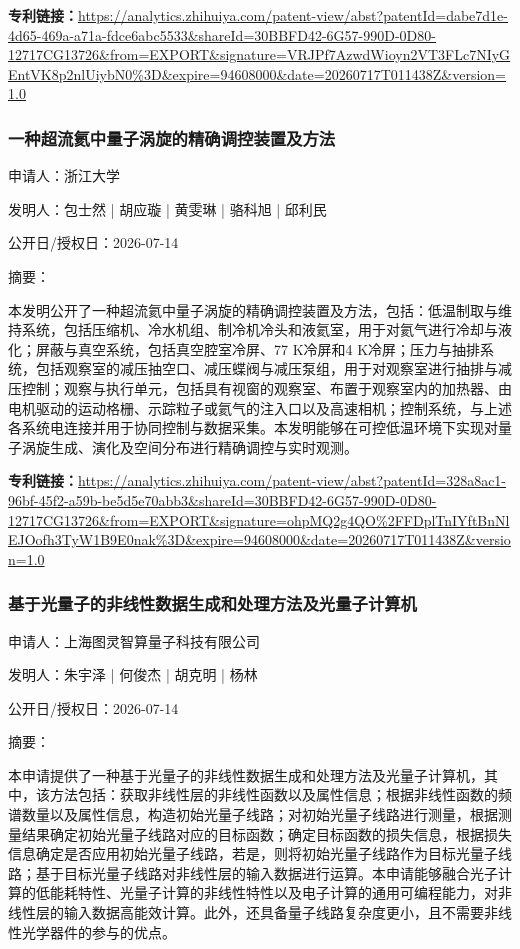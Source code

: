\documentclass[12pt,a4paper]{ctexart}
\begin{document}
\noindent\textbf{专利链接：}\url{https://analytics.zhihuiya.com/patent-view/abst?patentId=dabe7d1e-4d65-469a-a71a-fdce6abc5533&shareId=30BBFD42-6G57-990D-0D80-12717CG13726&from=EXPORT&signature=VRJPf7AzwdWioyn2VT3FLc7NIyGEntVK8p2nlUiybN0%3D&expire=94608000&date=20260717T011438Z&version=1.0}

\subsubsection{ 一种超流氦中量子涡旋的精确调控装置及方法 }

申请人：浙江大学

发明人：包士然 | 胡应璇 | 黄雯琳 | 骆科旭 | 邱利民

公开日/授权日：2026-07-14

摘要：

本发明公开了一种超流氦中量子涡旋的精确调控装置及方法，包括：低温制取与维持系统，包括压缩机、冷水机组、制冷机冷头和液氦室，用于对氦气进行冷却与液化；屏蔽与真空系统，包括真空腔室冷屏、77 K冷屏和4 K冷屏；压力与抽排系统，包括观察室的减压抽空口、减压蝶阀与减压泵组，用于对观察室进行抽排与减压控制；观察与执行单元，包括具有视窗的观察室、布置于观察室内的加热器、由电机驱动的运动格栅、示踪粒子或氦气的注入口以及高速相机；控制系统，与上述各系统电连接并用于协同控制与数据采集。本发明能够在可控低温环境下实现对量子涡旋生成、演化及空间分布进行精确调控与实时观测。

\noindent\textbf{专利链接：}\url{https://analytics.zhihuiya.com/patent-view/abst?patentId=328a8ac1-96bf-45f2-a59b-be5d5e70abb3&shareId=30BBFD42-6G57-990D-0D80-12717CG13726&from=EXPORT&signature=ohpMQ2g4QO%2FFDplTnIYftBnNlEJOofh3TyW1B9E0nak%3D&expire=94608000&date=20260717T011438Z&version=1.0}

\subsubsection{ 基于光量子的非线性数据生成和处理方法及光量子计算机 }

申请人：上海图灵智算量子科技有限公司

发明人：朱宇泽 | 何俊杰 | 胡克明 | 杨林

公开日/授权日：2026-07-14

摘要：

本申请提供了一种基于光量子的非线性数据生成和处理方法及光量子计算机，其中，该方法包括：获取非线性层的非线性函数以及属性信息；根据非线性函数的频谱数量以及属性信息，构造初始光量子线路；对初始光量子线路进行测量，根据测量结果确定初始光量子线路对应的目标函数；确定目标函数的损失信息，根据损失信息确定是否应用初始光量子线路，若是，则将初始光量子线路作为目标光量子线路；基于目标光量子线路对非线性层的输入数据进行运算。本申请能够融合光子计算的低能耗特性、光量子计算的非线性特性以及电子计算的通用可编程能力，对非线性层的输入数据高能效计算。此外，还具备量子线路复杂度更小，且不需要非线性光学器件的参与的优点。
\end{document}
